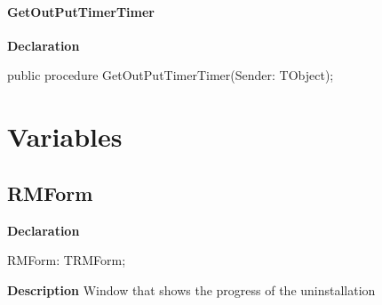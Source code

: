 \documentclass{report}
\newif\ifpdf
\begin{document}
\paragraph*{GetOutPutTimerTimer}\hspace*{\fill}

\label{uninstall.TRMForm-GetOutPutTimerTimer}
\begin{list}{}{
\setlength{\itemindent}{0cm}
\setlength{\listparindent}{0cm}
\setlength{\leftmargin}{\evensidemargin}
\addtolength{\leftmargin}{\tmplength}
\settowidth{\labelsep}{X}
\addtolength{\leftmargin}{\labelsep}
\setlength{\labelwidth}{\tmplength}
}
\item[\textbf{Declaration}\hfill]
\ifpdf
\begin{flushleft}
\fi
\begin{ttfamily}
public procedure GetOutPutTimerTimer(Sender: TObject);\end{ttfamily}

\ifpdf
\end{flushleft}
\fi

\end{list}
\section{Variables}
\ifpdf
\subsection*{\large{\textbf{RMForm}}\normalsize\hspace{1ex}\hrulefill}
\else
\subsection*{RMForm}
\fi
\label{uninstall-RMForm}
\begin{list}{}{
\setlength{\itemindent}{0cm}
\setlength{\listparindent}{0cm}
\setlength{\leftmargin}{\evensidemargin}
\addtolength{\leftmargin}{\tmplength}
\settowidth{\labelsep}{X}
\addtolength{\leftmargin}{\labelsep}
\setlength{\labelwidth}{\tmplength}
}
\item[\textbf{Declaration}\hfill]
\ifpdf
\begin{flushleft}
\fi
\begin{ttfamily}
RMForm: TRMForm;\end{ttfamily}

\ifpdf
\end{flushleft}
\fi

\par
\item[\textbf{Description}]
Window that shows the progress of the uninstallation

\end{list}
\end{document}
